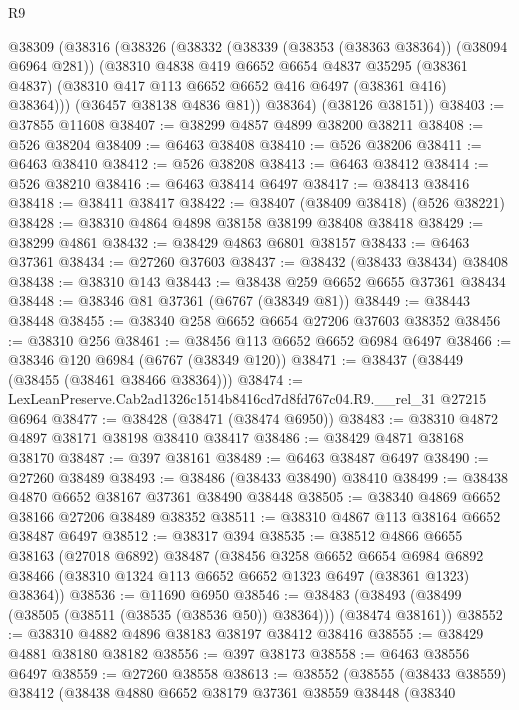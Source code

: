 \begin{lexlean}{R9}
\begin{coremodule}
    @38309
      (@38316
        (@38326
          (@38332
            (@38339 (@38353 (@38363 @38364)) (@38094 @6964 @281))
            (@38310
              @4838
              @419
              @6652
              @6654
              @4837
              @35295
              (@38361 @4837)
              (@38310 @417 @113 @6652 @6652 @416 @6497 (@38361 @416) @38364)))
          (@36457 @38138 @4836 @81))
        @38364)
      (@38126 @38151))
@38403 := @37855 @11608
@38407 := @38299 @4857 @4899 @38200 @38211
@38408 := @526 @38204
@38409 := @6463 @38408
@38410 := @526 @38206
@38411 := @6463 @38410
@38412 := @526 @38208
@38413 := @6463 @38412
@38414 := @526 @38210
@38416 := @6463 @38414 @6497
@38417 := @38413 @38416
@38418 := @38411 @38417
@38422 := @38407 (@38409 @38418) (@526 @38221)
@38428 := @38310 @4864 @4898 @38158 @38199 @38408 @38418
@38429 := @38299 @4861
@38432 := @38429 @4863 @6801 @38157
@38433 := @6463 @37361
@38434 := @27260 @37603
@38437 := @38432 (@38433 @38434) @38408
@38438 := @38310 @143
@38443 := @38438 @259 @6652 @6655 @37361 @38434
@38448 := @38346 @81 @37361 (@6767 (@38349 @81))
@38449 := @38443 @38448
@38455 := @38340 @258 @6652 @6654 @27206 @37603 @38352
@38456 := @38310 @256
@38461 := @38456 @113 @6652 @6652 @6984 @6497
@38466 := @38346 @120 @6984 (@6767 (@38349 @120))
@38471 := @38437 (@38449 (@38455 (@38461 @38466 @38364)))
@38474 := LexLeanPreserve.Cab2ad1326c1514b8416cd7d8fd767c04.R9.__rel_31 @27215 @6964
@38477 := @38428 (@38471 (@38474 @6950))
@38483 := @38310 @4872 @4897 @38171 @38198 @38410 @38417
@38486 := @38429 @4871 @38168 @38170
@38487 := @397 @38161
@38489 := @6463 @38487 @6497
@38490 := @27260 @38489
@38493 := @38486 (@38433 @38490) @38410
@38499 := @38438 @4870 @6652 @38167 @37361 @38490 @38448
@38505 := @38340 @4869 @6652 @38166 @27206 @38489 @38352
@38511 := @38310 @4867 @113 @38164 @6652 @38487 @6497
@38512 := @38317 @394
@38535 := @38512
    @4866
    @6655
    @38163
    (@27018 @6892)
    @38487
    (@38456
      @3258
      @6652
      @6654
      @6984
      @6892
      @38466
      (@38310 @1324 @113 @6652 @6652 @1323 @6497 (@38361 @1323) @38364))
@38536 := @11690 @6950
@38546 := @38483 (@38493 (@38499 (@38505 (@38511 (@38535 (@38536 @50)) @38364))) (@38474 @38161))
@38552 := @38310 @4882 @4896 @38183 @38197 @38412 @38416
@38555 := @38429 @4881 @38180 @38182
@38556 := @397 @38173
@38558 := @6463 @38556 @6497
@38559 := @27260 @38558
@38613 := @38552
    (@38555
      (@38433 @38559)
      @38412
      (@38438
        @4880
        @6652
        @38179
        @37361
        @38559
        @38448
        (@38340

\end{coremodule}
\end{lexlean}
